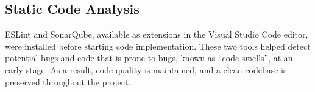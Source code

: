 \subsection{Static Code Analysis}
\label{sec:static-code-analysis}

ESLint and SonarQube, available as extensions in the Visual Studio Code editor, were installed before starting code implementation. These two tools helped detect potential bugs and code that is prone to bugs, known as ``code smells'', at an early stage. As a result, code quality is maintained, and a clean codebase is preserved throughout the project.